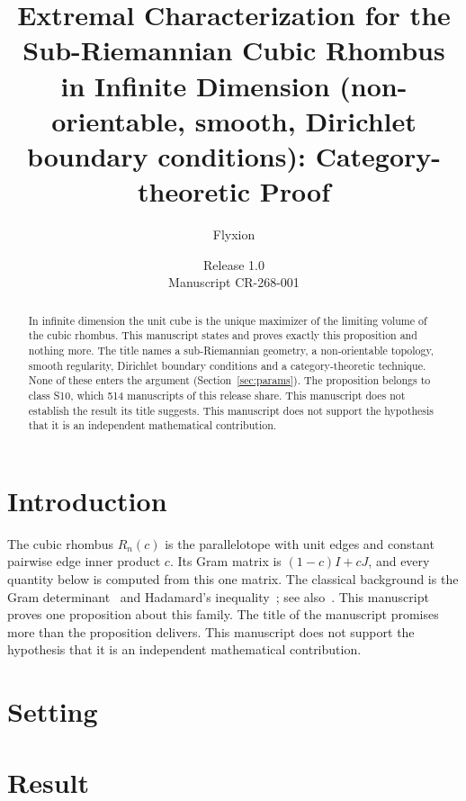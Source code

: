 \documentclass[11pt]{article}
\title{Extremal Characterization for the Sub-Riemannian Cubic Rhombus in Infinite Dimension (non-orientable, smooth, Dirichlet boundary conditions): Category-theoretic Proof}
\author{Flyxion}
\date{Release 1.0\\ Manuscript CR-268-001}
\begin{document}
\maketitle
\begin{abstract}
In infinite dimension the unit cube is the unique maximizer of the limiting volume of the cubic rhombus. This manuscript states and proves exactly this proposition and nothing more. The title names a sub-Riemannian geometry, a non-orientable topology, smooth regularity, Dirichlet boundary conditions and a category-theoretic technique. None of these enters the argument (Section~\ref{sec:params}). The proposition belongs to class S10, which 514 manuscripts of this release share. This manuscript does not establish the result its title suggests. This manuscript does not support the hypothesis that it is an independent mathematical contribution.
\end{abstract}

\section{Introduction}
The cubic rhombus $R_n(c)$ is the parallelotope with unit edges and constant pairwise edge inner product $c$. Its Gram matrix is $(1-c)I+cJ$, and every quantity below is computed from this one matrix. The classical background is the Gram determinant~\cite{gram} and Hadamard's inequality~\cite{hadamard}; see also~\cite{hj}.
This manuscript proves one proposition about this family. The title of the manuscript promises more than the proposition delivers. This manuscript does not support the hypothesis that it is an independent mathematical contribution.

\section{Setting}


\section{Result}

\end{document}
